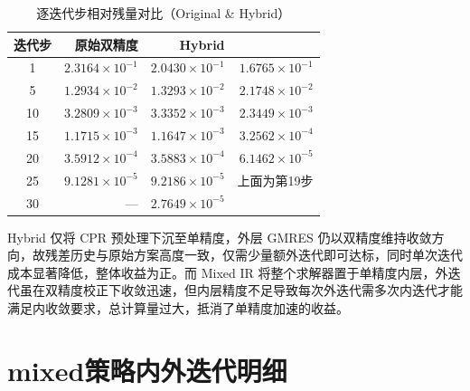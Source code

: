 \documentclass[12pt,a4paper]{article}
\begin{document}
\begin{table}[htbp]
\centering
\caption{逐迭代步相对残量对比（Original \& Hybrid）}
\label{tab:gmres_residual}
\begin{tabular}{crrr}
\toprule
迭代步 & 原始双精度 & Hybrid \\
\midrule
 1 & $2.3164\times10^{-1}$ & $2.0430\times10^{-1}$ & $1.6765\times10^{-1}$ \\
 5 & $1.2934\times10^{-2}$ & $1.3293\times10^{-2}$ & $2.1748\times10^{-2}$ \\
10 & $3.2809\times10^{-3}$ & $3.3352\times10^{-3}$ & $2.3449\times10^{-3}$ \\
15 & $1.1715\times10^{-3}$ & $1.1647\times10^{-3}$ & $3.2562\times10^{-4}$ \\
20 & $3.5912\times10^{-4}$ & $3.5883\times10^{-4}$ & $6.1462\times10^{-5}$ \\
25 & $9.1281\times10^{-5}$ & $9.2186\times10^{-5}$ & 上面为第19步 \\
30 & ---                  & $2.7649\times10^{-5}$ \\
\bottomrule
\end{tabular}
\end{table}

Hybrid 仅将 CPR 预处理下沉至单精度，外层 GMRES 仍以双精度维持收敛方向，故残差历史与原始方案高度一致，仅需少量额外迭代即可达标，同时单次迭代成本显著降低，整体收益为正。而 Mixed IR 将整个求解器置于单精度内层，外迭代虽在双精度校正下收敛迅速，但内层精度不足导致每次外迭代需多次内迭代才能满足内收敛要求，总计算量过大，抵消了单精度加速的收益。

\newpage

\section{mixed策略内外迭代明细}
\end{document}
